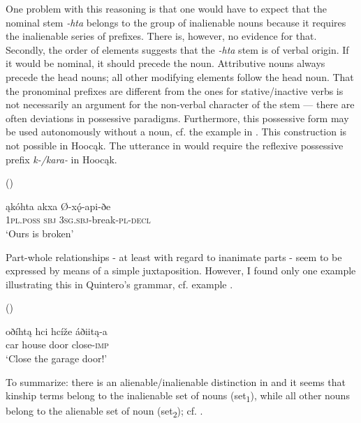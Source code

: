 \documentclass[output=paper]{LSP/langsci}
\begin{document}
One problem with this reasoning is that one would have to expect that the nominal stem \textit{-hta} belongs to the group of inalienable nouns because it requires the inalienable series of prefixes. There is, however, no evidence for that. Secondly, the order of elements suggests that the \textit{-hta} stem is of verbal origin. If it would be nominal, it should precede the  noun. Attributive nouns always precede the head nouns; all other modifying elements follow the head noun. That the pronominal prefixes are different from the ones for stative/inactive verbs is not necessarily an argument for the non-verbal character of the stem --- there are often deviations in possessive paradigms. Furthermore, this possessive form may be used autonomously without a  noun, cf. the example in . This construction is not possible in Hoocąk. The utterance in  would require the reflexive possessive prefix \textit{k-/kara-} in Hoocąk.

\ea	{} (\citealt[413]{Quintero2004}) \label{osagebroken}

\gll ąkóhta     akxa     Ø-xǫ́-api-ðe \\
\textsc{1pl.poss} \textsc{sbj} \textsc{3sg.sbj}-break-\textsc{pl-decl} \\
\glt `Ours is broken'
\z 

Part-whole relationships - at least with regard to inanimate parts - seem to be expressed by means of a simple juxtaposition. However, I found only one example illustrating this in Quintero's grammar, cf. example .

\ea	{} (\citealt[423]{Quintero2004}) \label{osagegarage}

\gll oðíhtą hci      hcíže áðiitą-a \\
car       house door close-\textsc{imp} \\
\glt `Close the garage door!'
\z

To summarize: there is an alienable/inalienable distinction in  and it seems that kinship terms belong to the inalienable set of nouns (set\textsubscript{1}), while all other nouns belong to the alienable set of noun (set\textsubscript{2}); cf. .
\end{document}

